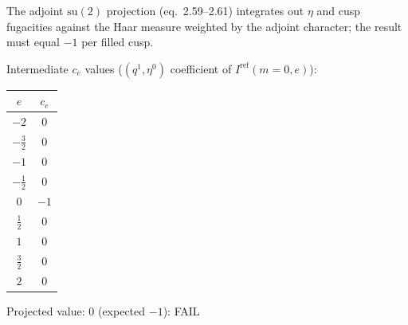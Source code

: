 \documentclass[11pt,a4paper]{article}
\newcommand{\Iref}{I^{\mathrm{ref}}}
\newcommand{\failmark}{\textcolor{fail}{FAIL}}
\begin{document}
The adjoint $\mathrm{su}(2)$ projection (eq.~2.59--2.61) integrates out $\eta$ and cusp fugacities against the Haar measure weighted by the adjoint character; the result must equal $-1$ per filled cusp.

Intermediate $c_e$ values ($(q^1, \eta^0)$ coefficient of $\Iref(m=0, e)$):
\begin{center}
\begin{tabular}{c c}
\toprule
$e$ & $c_e$ \\ \midrule
  $-2$ & $0$ \\
  $-\tfrac{3}{2}$ & $0$ \\
  $-1$ & $0$ \\
  $-\tfrac{1}{2}$ & $0$ \\
  $0$ & $-1$ \\
  $\tfrac{1}{2}$ & $0$ \\
  $1$ & $0$ \\
  $\tfrac{3}{2}$ & $0$ \\
  $2$ & $0$ \\
\bottomrule
\end{tabular}
\end{center}

Projected value: $0$ (expected $-1$): \failmark
\end{document}
